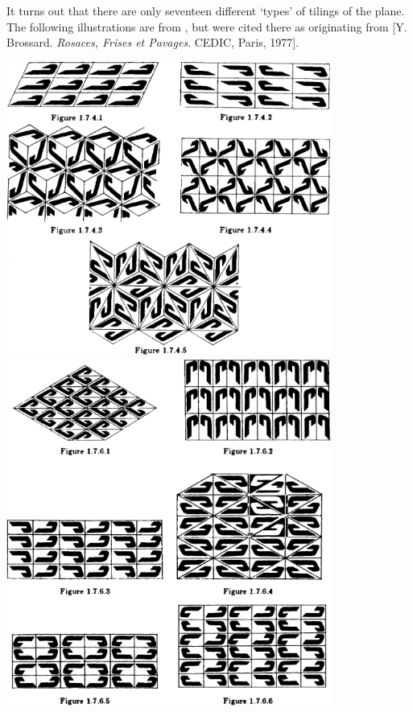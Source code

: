 \documentclass[a4paper]{report}
\theoremstyle{definition}
\begin{document}
  It turns out that there are only seventeen different `types' of tilings of the plane. The
  following illustrations are from \autocite[13,19]{berger}, but were cited there as originating
  from [Y. Brossard. \textit{Rosaces, Frises et Pavages}. CEDIC, Paris, 1977].

  \begin{center}
    \includegraphics[width=0.8\textwidth]{tilings0}
    \includegraphics[width=0.8\textwidth]{tilings1}

\end{center}
\end{document}
